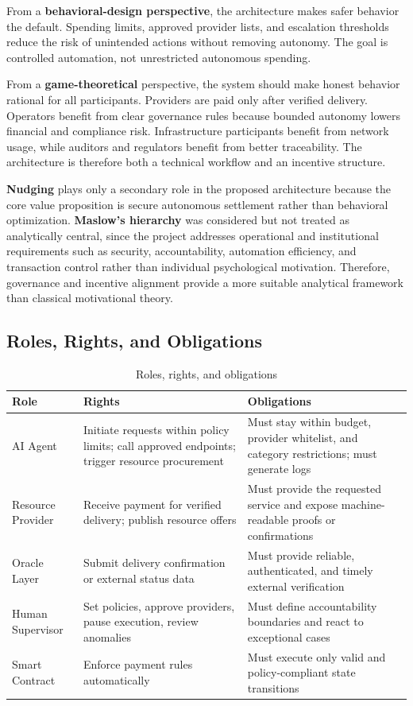 \documentclass[12pt,a4paper,oneside]{article}
\theoremstyle{definition}
\theoremstyle{plain}
\begin{document}
From a \textbf{behavioral-design perspective}, the architecture makes safer behavior the default. Spending limits, approved provider lists, and escalation thresholds reduce the risk of unintended actions without removing autonomy. The goal is controlled automation, not unrestricted autonomous spending.

From a \textbf{game-theoretical} perspective, the system should make honest behavior rational for all participants. Providers are paid only after verified delivery. Operators benefit from clear governance rules because bounded autonomy lowers financial and compliance risk. Infrastructure participants benefit from network usage, while auditors and regulators benefit from better traceability. The architecture is therefore both a technical workflow and an incentive structure.

\textbf{Nudging} plays only a secondary role in the proposed architecture because the core value proposition is secure autonomous settlement rather than behavioral optimization.
\textbf{Maslow’s hierarchy} was considered but not treated as analytically central, since the project addresses operational and institutional requirements such as security, accountability, automation efficiency, and transaction control rather than individual psychological motivation. Therefore, governance and incentive alignment provide a more suitable analytical framework than classical motivational theory.
\subsection{Roles, Rights, and Obligations}

\begin{table}[H]
\centering
\caption{Roles, rights, and obligations}
\label{tab:rightsobligations}
\begin{tabular}{p{2.7cm}p{5.2cm}p{6.2cm}}
\toprule
\textbf{Role} & \textbf{Rights} & \textbf{Obligations} \\
\midrule
AI Agent & Initiate requests within policy limits; call approved endpoints; trigger resource procurement & Must stay within budget, provider whitelist, and category restrictions; must generate logs \\
Resource Provider & Receive payment for verified delivery; publish resource offers & Must provide the requested service and expose machine-readable proofs or confirmations \\
Oracle Layer & Submit delivery confirmation or external status data & Must provide reliable, authenticated, and timely external verification \\
Human Supervisor & Set policies, approve providers, pause execution, review anomalies & Must define accountability boundaries and react to exceptional cases \\
Smart Contract & Enforce payment rules automatically & Must execute only valid and policy-compliant state transitions \\
\bottomrule
\end{tabular}
\end{table}
\end{document}
